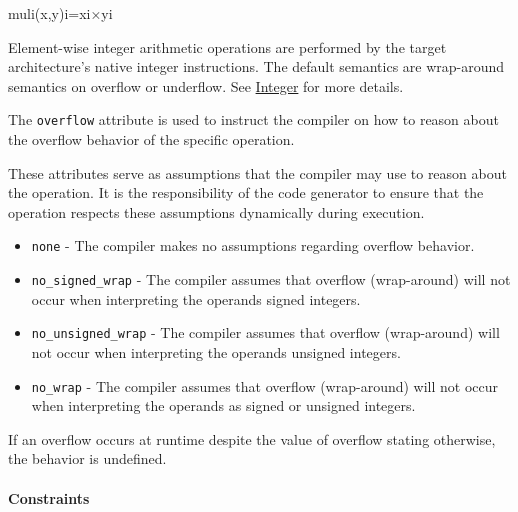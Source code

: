 \documentclass{article}
\begin{document}
muli(x,y)i=xi×yi

Element-wise integer arithmetic operations are performed by the target architecture's native integer instructions. The default semantics are wrap-around semantics on overflow or underflow. See \href{https://docs.nvidia.com/cuda/tile-ir/latest/sections/operations.html#op-group-integer}{Integer} for more details.


The \texttt{overflow} attribute is used to instruct the compiler on how to reason about the overflow behavior of the specific operation.


These attributes serve as assumptions that the compiler may use to reason about the operation. It is the responsibility of the code generator to ensure that the operation respects these assumptions dynamically during execution.


\begin{itemize}
\item \texttt{none} - The compiler makes no assumptions regarding overflow behavior.
\item \texttt{no\_signed\_wrap} - The compiler assumes that overflow (wrap-around) will not occur when interpreting the operands signed integers.
\item \texttt{no\_unsigned\_wrap} - The compiler assumes that overflow (wrap-around) will not occur when interpreting the operands unsigned integers.
\item \texttt{no\_wrap} - The compiler assumes that overflow (wrap-around) will not occur when interpreting the operands as signed or unsigned integers.

\end{itemize}
If an overflow occurs at runtime despite the value of overflow stating otherwise, the behavior is undefined.



\paragraph{Constraints}
\end{document}
